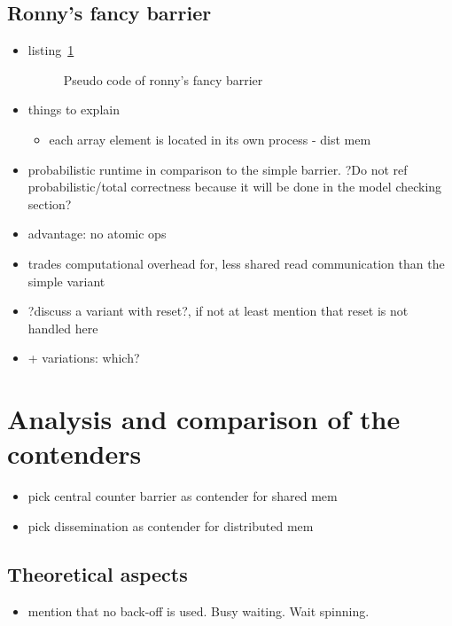 \documentclass[a4paper, 10pt]{article}
\begin{document}
\subsection{Ronny's fancy barrier}
\begin{itemize}
	\item listing~\ref{listing:ronny-fancy-no-reset}
		\begin{figure}[htbp]
			\centering
			
			\caption{Pseudo code of ronny's fancy barrier}
			\label{listing:ronny-fancy-no-reset}
		\end{figure}

	\item things to explain
		\begin{itemize}
			\item each array element is located in its own process - dist mem
		\end{itemize}

	\item probabilistic runtime in comparison to the simple barrier. ?Do not ref probabilistic/total correctness because it will be done in the model checking section?
	\item advantage: no atomic ops
	\item trades computational overhead for, less shared read communication than the simple variant
	\item ?discuss a variant with reset?, if not at least mention that reset is not handled here
	\item + variations: which?
\end{itemize}

\section{Analysis and comparison of the contenders}

\begin{itemize}
	\item pick central counter barrier as contender for shared mem
	\item pick dissemination as contender for distributed mem
\end{itemize}

\subsection{Theoretical aspects}
\begin{itemize}
	\item mention that no back-off is used. Busy waiting. Wait spinning.
\end{itemize}
\end{document}
